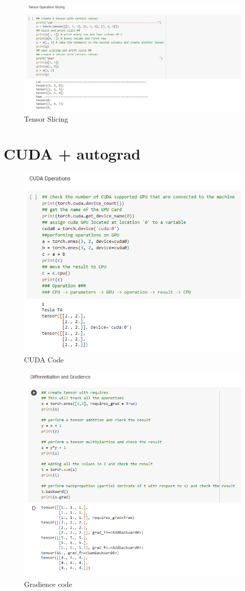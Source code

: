 \documentclass[24pt, letterpaper]{article}
\begin{document}
		\begin{figure}
			\centering
			\includegraphics[width=0.7\linewidth]{Lab1Img/TensorSlicing}
			\caption{Tensor Slicing}
			\label{fig:tensorslicing}
		\end{figure}
		\FloatBarrier
		
	\section{CUDA + autograd}
		\begin{figure}[ht]
			\centering
			\includegraphics[width=0.7\linewidth]{Lab1Img/CUDA}
			\caption{CUDA Code}
			\label{fig:CUDA}
		\end{figure}
		\begin{figure}[ht]
			\centering
			\includegraphics[width=0.7\linewidth]{Lab1Img/Gradience}
			\caption{Gradience code}
			\label{fig:gradience}
		\end{figure}
		\FloatBarrier			
	
\end{document}
